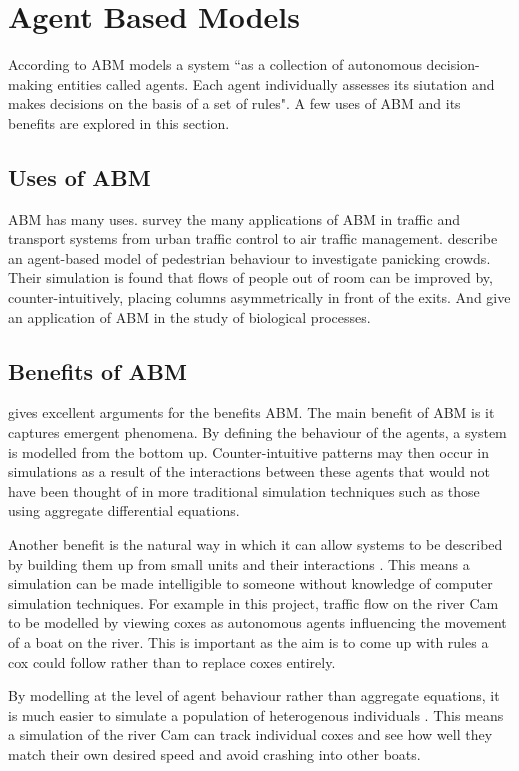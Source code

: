    \section{Agent Based Models}
    According to \textcite{Bonabeau2002} ABM models a system ``as a collection of autonomous decision-making entities called agents. Each agent individually assesses its siutation and makes decisions on the basis of a set of rules". A few uses of ABM and its benefits are explored in this section.
    
    \subsection{Uses of ABM}
    ABM has many uses. \textcite{Chen2010} survey the many applications of ABM in traffic and transport systems from urban traffic control to air traffic management. \textcite{Helbing2000} describe an agent-based model of pedestrian behaviour to investigate panicking crowds. Their simulation is found that flows of people out of room can be improved by, counter-intuitively, placing columns asymmetrically in front of the exits. And \textcite{Miller2010} give an application of ABM in the study of biological processes.
    
    \subsection{Benefits of ABM}
      \textcite{Bonabeau2002} gives excellent arguments for the benefits ABM. The main benefit of ABM is it captures emergent phenomena. By defining the behaviour of the agents, a system is modelled from the bottom up. Counter-intuitive patterns may then occur in simulations as a result of the interactions between these agents that would not have been thought of in more traditional simulation techniques such as those using aggregate differential equations.
      
      Another benefit is the natural way in which it can allow systems to be described by building them up from small units and their interactions \cite{Bonabeau2002}. This means a simulation can be made intelligible to someone without knowledge of computer simulation techniques. For example in this project, traffic flow on the river Cam to be modelled by viewing coxes as autonomous agents influencing the movement of a boat on the river. This is important as the aim is to come up with rules a cox could follow rather than to replace coxes entirely. 
    
    By modelling at the level of agent behaviour rather than aggregate equations, it is much easier to simulate a population of heterogenous individuals \cite{Bonabeau2002}. This means a simulation of the river Cam can track individual coxes and see how well they match their own desired speed and avoid crashing into other boats.
    
